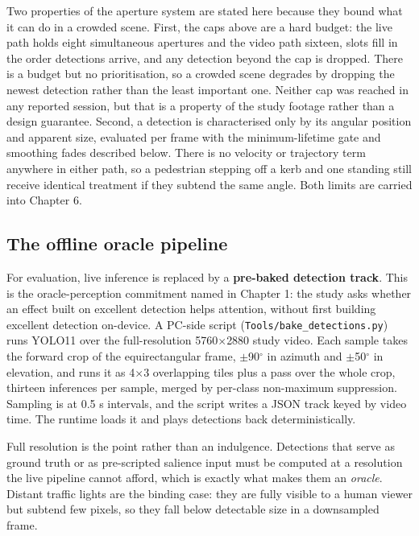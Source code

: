 Two properties of the aperture system are stated here because they bound what it can do in a crowded
scene. First, the caps above are a hard budget: the live path holds eight simultaneous apertures and
the video path sixteen, slots fill in the order detections arrive, and any detection beyond the cap
is dropped. There is a budget but no prioritisation, so a crowded scene degrades by dropping the
newest detection rather than the least important one. Neither cap was reached in any reported
session, but that is a property of the study footage rather than a design guarantee. Second, a
detection is characterised only by its angular position and apparent size, evaluated per frame with
the minimum-lifetime gate and smoothing fades described below. There is no velocity or trajectory
term anywhere in either path, so a pedestrian stepping off a kerb and one standing still receive
identical treatment if they subtend the same angle. Both limits are carried into Chapter 6.

\subsection{The offline oracle pipeline}

For evaluation, live inference is replaced by a \textbf{pre-baked detection track}. This is the
oracle-perception commitment named in Chapter 1: the study asks whether an effect built on excellent
detection helps attention, without first building excellent detection on-device. A PC-side script
(\verb|Tools/bake_detections.py|) runs YOLO11 \citep{jocher2024} over the full-resolution
5760$\times$2880 study video. Each sample takes the forward crop of the equirectangular frame,
$\pm$90$^{\circ}$ in azimuth and $\pm$50$^{\circ}$ in elevation, and runs it as 4$\times$3
overlapping tiles plus a pass over the whole crop, thirteen inferences per sample, merged by
per-class non-maximum suppression. Sampling is at 0.5 s intervals, and the script writes a JSON
track keyed by video time. The runtime loads it and plays detections back deterministically.

Full resolution is the point rather than an indulgence. Detections that serve as ground truth or as
pre-scripted salience input must be computed at a resolution the live pipeline cannot afford, which
is exactly what makes them an \textit{oracle}. Distant traffic lights are the binding case: they are
fully visible to a human viewer but subtend few pixels, so they fall below detectable size in a
downsampled frame.

